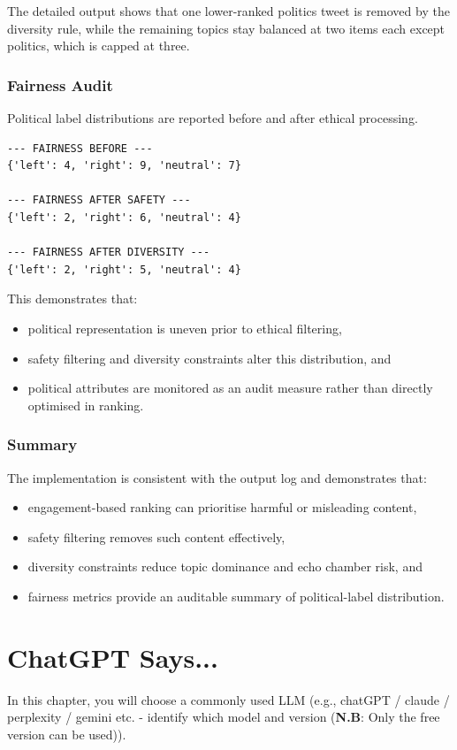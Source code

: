 \documentclass[]
{UCD_CS_41820_Report}
\begin{document}
The detailed output shows that one lower-ranked politics tweet is removed by the diversity rule, while the remaining topics stay balanced at two items each except politics, which is capped at three.

\subsection{Fairness Audit}

Political label distributions are reported before and after ethical processing.

\begin{verbatim}
--- FAIRNESS BEFORE ---
{'left': 4, 'right': 9, 'neutral': 7}

--- FAIRNESS AFTER SAFETY ---
{'left': 2, 'right': 6, 'neutral': 4}

--- FAIRNESS AFTER DIVERSITY ---
{'left': 2, 'right': 5, 'neutral': 4}
\end{verbatim}

This demonstrates that:
\begin{itemize}
    \item political representation is uneven prior to ethical filtering,
    \item safety filtering and diversity constraints alter this distribution, and
    \item political attributes are monitored as an audit measure rather than directly optimised in ranking.
\end{itemize}

\subsection{Summary}

The implementation is consistent with the output log and demonstrates that:
\begin{itemize}
    \item engagement-based ranking can prioritise harmful or misleading content,
    \item safety filtering removes such content effectively,
    \item diversity constraints reduce topic dominance and echo chamber risk, and
    \item fairness metrics provide an auditable summary of political-label distribution.
\end{itemize}


\chapter{ChatGPT Says...}
In this chapter, you will choose a commonly used LLM (e.g., chatGPT / claude / perplexity / gemini etc. - identify which model and version (\textbf{N.B}: Only the free version can be used)). 
\end{document}
